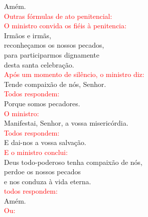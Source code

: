 \documentclass{book}
\begin{document}
\begin{flushleft}
    Amém.
    \vspace{.1cm} \\
    \textcolor{red}{Outras fórmulas de ato penitencial:}
    \vspace{.1cm} \\
    \textcolor{red}{O ministro convida os fiéis à penitencia:}
    \vspace{.1cm} \\
    Irmãos e irmãs, \\
    reconheçamos os nossos pecados, \\
    para participarmos dignamente \\
    desta santa celebração.
    \vspace{.1cm} \\
    \textcolor{red}{Após um momento de silêncio, o ministro diz:}
    \vspace{.1cm} \\
    Tende compaixão de nós, Senhor.
    \vspace{.1cm} \\
    \textcolor{red}{Todos respondem:}
    \vspace{.1cm} \\
    Porque somos pecadores.
    \vspace{.1cm} \\
    \textcolor{red}{O ministro:}
    \vspace{.1cm} \\
    Manifestai, Senhor, a vossa misericórdia.
    \vspace{.1cm} \\
    \textcolor{red}{Todos respondem:}
    \vspace{.1cm} \\
    E dai-nos a vossa salvação.
    \vspace{.1cm} \\
    \textcolor{red}{E o ministro conclui:}
    \vspace{.1cm} \\
    Deus todo-poderoso tenha compaixão de nós, \\
    perdoe os nossos pecados \\
    e nos conduza à vida eterna.
    \vspace{.1cm} \\
    \textcolor{red}{todos respondem:}
    \vspace{.1cm} \\
    Amém.
    \vspace{.1cm} \\
    \textcolor{red}{Ou:}

\end{flushleft}
\end{document}
